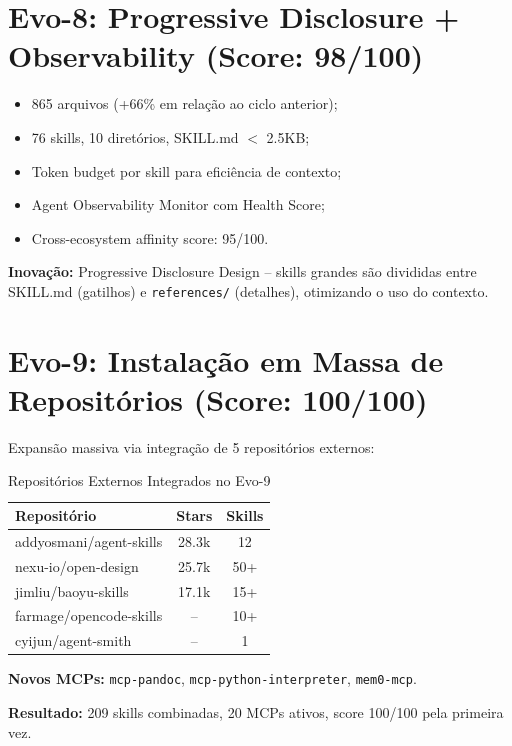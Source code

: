 \documentclass[12pt,a4paper,sumario=tradicional]{abntex2}
\begin{document}
\section{Evo-8: Progressive Disclosure + Observability (Score: 98/100)}

\begin{itemize}
    \item 865 arquivos (+66\% em relação ao ciclo anterior);
    \item 76 skills, 10 diretórios, SKILL.md $<$ 2.5KB;
    \item Token budget por skill para eficiência de contexto;
    \item Agent Observability Monitor com Health Score;
    \item Cross-ecosystem affinity score: 95/100.
\end{itemize}

\textbf{Inovação:} Progressive Disclosure Design -- skills grandes são divididas entre SKILL.md (gatilhos) e \texttt{references/} (detalhes), otimizando o uso do contexto.

\section{Evo-9: Instalação em Massa de Repositórios (Score: 100/100)}

Expansão massiva via integração de 5 repositórios externos:
\begin{longtable}{@{}lcc@{}}
\caption{Repositórios Externos Integrados no Evo-9}\\
\toprule
\textbf{Repositório} & \textbf{Stars} & \textbf{Skills} \\
\midrule
addyosmani/agent-skills & 28.3k & 12 \\
nexu-io/open-design & 25.7k & 50+ \\
jimliu/baoyu-skills & 17.1k & 15+ \\
farmage/opencode-skills & -- & 10+ \\
cyijun/agent-smith & -- & 1 \\
\bottomrule
\end{longtable}

\textbf{Novos MCPs:} \texttt{mcp-pandoc}, \texttt{mcp-python-interpreter}, \texttt{mem0-mcp}.

\textbf{Resultado:} 209 skills combinadas, 20 MCPs ativos, score 100/100 pela primeira vez.

\end{document}
